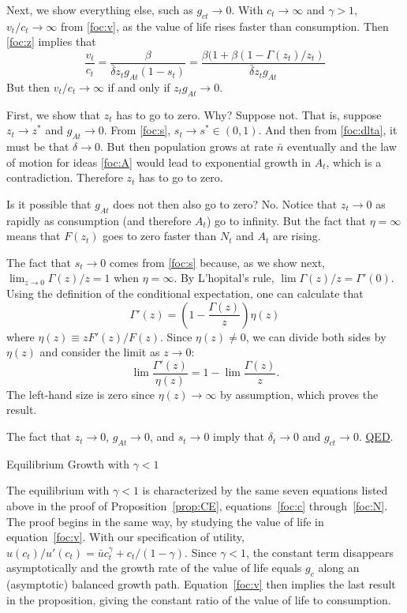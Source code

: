 \documentclass[12pt,twoside]{article}
\newcommand{\Proof}[2]{\newline {\hspace{-\parindent} {\color{ChadGreen}\bf Proof of Proposition}~\ref{#1}.}
{\color{ChadBlue} #2} \vspace{.1in}}
\begin{document}
Next, we show everything else, such as $g_{ct} \rightarrow 0$.  With
$c_t \rightarrow \infty$ and $\gamma>1$, $v_t/c_t \rightarrow \infty$
from \eqref{foc:v}, as the value of life rises faster than consumption.
Then \eqref{foc:z} implies that
\[
\frac{v_t}{c_t} = \frac{\beta}{\bar\delta z_t g_{At} (1-s_t)}
 = \frac{\beta (1+\beta(1-\Gamma(z_t)/z_t)}{\bar\delta z_t g_{At}}
\]
But then $v_t/c_t \rightarrow \infty$ if and only if $z_t g_{At}
\rightarrow 0$.

First, we show that $z_t$ has to go to zero. Why? Suppose not. That is,
suppose $z_t \rightarrow z^*$ and $g_{At} \rightarrow 0$. From
\eqref{foc:s}, $s_t \rightarrow s^* \in (0,1)$. And then from
\eqref{foc:dlta}, it must be that $\delta \rightarrow 0$. But then
population grows at rate $\bar{n}$ eventually and the law of motion for
ideas \eqref{foc:A} would lead to exponential growth in $A_t$, which is
a contradiction. Therefore $z_t$ has to go to zero.

Is it possible that $g_{At}$ does not then also go to zero? No. Notice
that $z_t \rightarrow 0$ as rapidly as consumption (and therefore $A_t$)
go to infinity. But the fact that $\eta = \infty$ means that $F(z_t)$
goes to zero faster than $N_t$ and $A_t$ are rising.

The fact that $s_t \rightarrow 0$ comes from \eqref{foc:s} because, as
we show next, $\lim_{z \rightarrow 0} \Gamma(z)/z = 1$ when
$\eta=\infty$.  By L'hopital's rule, $\lim \Gamma(z)/z = \Gamma'(0)$.
Using the definition of the conditional expectation, one can calculate
that 
\[  \Gamma'(z) = \left(1-\frac{\Gamma(z)}{z} \right) \eta(z) \]
where $\eta(z) \equiv zF'(z)/F(z)$.  Since $\eta(z) \neq 0$, we can
divide both sides by $\eta(z)$ and consider the limit as $z \rightarrow
0$:
\[ \lim \frac{\Gamma'(z)}{\eta(z)} = 1 - \lim \frac{\Gamma(z)}{z}. \]
The left-hand size is zero since $\eta(z) \rightarrow \infty$ by
assumption, which proves the result.  

The fact that $z_t \rightarrow 0$, $g_{At} \rightarrow 0$, and $s_t
\rightarrow 0$ imply that $\delta_t \rightarrow 0$ and $g_{ct}
\rightarrow 0$.
\hyperlink{prop:eta}{QED}.


\hypertarget{proof:gamma}{}
\Proof{prop:gamma}{Equilibrium Growth with $\gamma<1$}

The equilibrium with $\gamma<1$ is characterized by the same seven
equations listed above in the proof of Proposition~\ref{prop:CE},
equations~\eqref{foc:c} through~\eqref{foc:N}. The proof begins in the
same way, by studying the value of life in equation~\eqref{foc:v}. With
our specification of utility, $u(c_t)/u'(c_t)=\bar{u} c_t ^\gamma +
c_t/(1-\gamma)$. Since $\gamma<1$, the constant term disappears
asymptotically and the growth rate of the value of life equals $g_c$
along an (asymptotic) balanced growth path. Equation~\eqref{foc:v} then
implies the last result in the proposition, giving the constant ratio of
the value of life to consumption.
\end{document}
